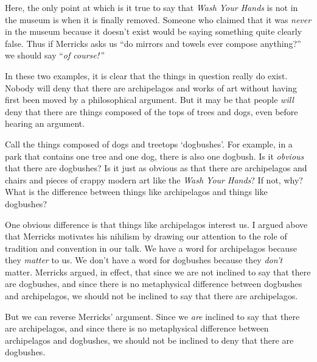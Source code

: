 \documentclass[11pt]{article}
\begin{document}
\begin{spacing}{1.25}
Here, the only point at which is it true to say that {\em Wash Your
  Hands} is not in the museum is when it is finally removed.  Someone
who claimed that it was {\em never} in the museum because it doesn't
exist would be saying something quite clearly false.  Thus if Merricks
asks us ``do mirrors and towels ever compose anything?'' we should say
``{\em of course!}\,''

In these two examples, it is clear that the things in question really
do exist.  Nobody will deny that there are archipelagos and works of
art without having first been moved by a philosophical argument.  But
it may be that people {\em will} deny that there are things composed
of the tops of trees and dogs, even before hearing an argument.

Call the things composed of dogs and treetops `dogbushes'.  For
example, in a park that contains one tree and one dog, there is also
one dogbush.  Is it {\em obvious} that there are dogbushes?  Is it
just as obvious as that there are archipelagos and chairs and pieces
of crappy modern art like the {\em Wash Your Hands}?  If not, why?
What is the difference between things like archipelagos and things
like dogbushes?

One obvious difference is that things like archipelagos interest us.
I argued above that Merricks motivates his nihilism by drawing our
attention to the role of tradition and convention in our talk.  We
have a word for archipelagos because they {\em matter} to us.  We
don't have a word for dogbushes because they {\em don't} matter.
Merricks argued, in effect, that since we are not inclined to say that
there are dogbushes, and since there is no metaphysical difference
between dogbushes and archipelagos, we should not be inclined to say
that there are archipelagos.

But we can reverse Merricks' argument.  Since we {\em are} inclined to
say that there are archipelagos, and since there is no metaphysical
difference between archipelagos and dogbushes, we should not be
inclined to deny that there are dogbushes.


\end{spacing}
\end{document}
